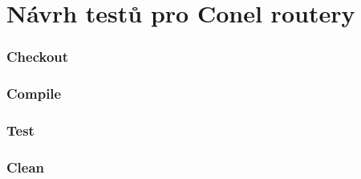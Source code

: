 \chapter{Návrh testů pro Conel routery}

\subsection{Checkout}
\subsection{Compile}
\subsection{Test}
\subsection{Clean}


\endinput
